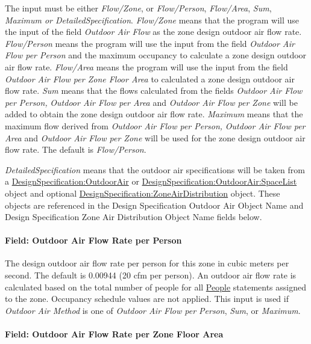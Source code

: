 The input must be either \emph{Flow/Zone}, or \emph{Flow/Person}, \emph{Flow/Area}, \emph{Sum}, \emph{Maximum or DetailedSpecification}. \emph{Flow/Zone} means that the program will use the input of the field \emph{Outdoor Air Flow} as the zone design outdoor air flow rate. \emph{Flow/Person} means the program will use the input from the field \emph{Outdoor Air Flow per Person} and the maximum occupancy to calculate a zone design outdoor air flow rate. \emph{Flow/Area} means the program will use the input from the field \emph{Outdoor Air Flow per Zone Floor Area} to calculated a zone design outdoor air flow rate. \emph{Sum} means that the flows calculated from the fields \emph{Outdoor Air Flow per Person,} \emph{Outdoor Air Flow per Area} and \emph{Outdoor Air Flow per Zone} will be added to obtain the zone design outdoor air flow rate. \emph{Maximum} means that the maximum flow derived from \emph{Outdoor Air Flow per Person,} \emph{Outdoor Air Flow per Area} and \emph{Outdoor Air Flow per Zone} will be used for the zone design outdoor air flow rate. The default is \emph{Flow/Person}.

\emph{DetailedSpecification} means that the outdoor air specifications will be taken from a \hyperref[designspecificationoutdoorair]{DesignSpecification:OutdoorAir} or \hyperref[designspecificationoutdoorairspacelist]{DesignSpecification:OutdoorAir:SpaceList} object and optional \hyperref[designspecificationzoneairdistribution]{DesignSpecification:ZoneAirDistribution} object. These objects are referenced in the Design Specification Outdoor Air Object Name and Design Specification Zone Air Distribution Object Name fields below.

\paragraph{Field: Outdoor Air Flow Rate per Person}\label{field-outdoor-air-flow-rate-per-person-6}

The design outdoor air flow rate per person for this zone in cubic meters per second. The default is 0.00944 (20 cfm per person). An outdoor air flow rate is calculated based on the total number of people for all \hyperref[people]{People} statements assigned to the zone. Occupancy schedule values are not applied. This input is used if \emph{Outdoor Air Method} is one of \emph{Outdoor Air Flow per Person}, \emph{Sum}, or \emph{Maximum}.

\paragraph{Field: Outdoor Air Flow Rate per Zone Floor Area}\label{field-outdoor-air-flow-rate-per-zone-floor-area-6}

